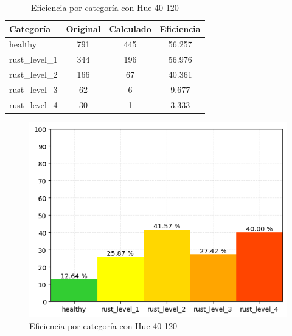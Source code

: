\captionsetup[figure]{skip=10pt}

\begin{table}[H]
\centering
\begin{tabular}{|l|c|c|c|}
\hline 
\textbf{Categoría} & \textbf{Original} & \textbf{Calculado} & \textbf{Eficiencia} \\
\hline
healthy & 791 & 445 & 56.257 \\
\hline 
rust\_level\_1 & 344 & 196 & 56.976 \\
\hline 
rust\_level\_2 & 166 & 67 & 40.361 \\
\hline 
rust\_level\_3 & 62 & 6 & 9.677 \\
\hline 
rust\_level\_4 & 30 & 1 & 3.333 \\
\hline 
\end{tabular}
\caption{Eficiencia por categoría con Hue 40-120}
\label{table:efficiency_categories_40_120}
\end{table}

\begin{figure}[H]
\centering
\includegraphics[scale=0.6]{images/result_classes_40_120.png}
\caption{Eficiencia por categoría con Hue 40-120}
\label{img:efficiency_categories_40_120}
\end{figure}
